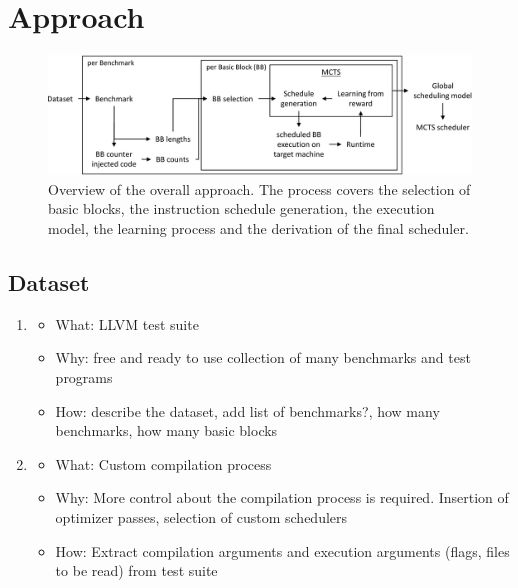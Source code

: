 \chapter{Approach}

\begin{figure}
    \centering
    \includegraphics[width=\textwidth]{img/ppt/approach_overview-crop.pdf}
    \caption[Overview of the approach]{Overview of the overall approach. 
    The process covers the selection of basic blocks, the instruction schedule generation, the execution model, the learning process and the derivation of the final scheduler.}
    \label{fig:approach:overview}
\end{figure}

\section{Dataset}
\label{sec:approach:dataset}
\begin{enumerate}
    \item 
    \begin{itemize}
        \item What: LLVM test suite
        \item Why: free and ready to use collection of many benchmarks and test programs
        \item How: describe the dataset, add list of benchmarks?, how many benchmarks, how many basic blocks
    \end{itemize}
    \item
    \begin{itemize}
        \item What: Custom compilation process
        \item Why: More control about the compilation process is required. Insertion of optimizer passes, selection of custom schedulers
        \item How: Extract compilation arguments and execution arguments (flags, files to be read) from test suite
    \end{itemize}
\end{enumerate}
    

